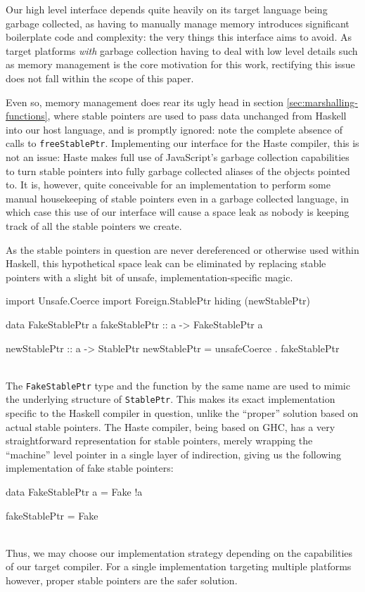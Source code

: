 \documentclass[preprint]{sigplanconf}
\begin{document}
Our high level interface depends quite heavily on its target language being
garbage collected, as having to manually manage memory introduces significant
boilerplate code and complexity: the very things this interface aims to avoid.
As target platforms \emph{with} garbage collection having to deal with low
level details such as memory management is the core motivation for this work,
rectifying this issue does not fall within the scope of this paper.

Even so, memory management does rear its ugly head in section
\ref{sec:marshalling-functions}, where stable pointers are used to pass data
unchanged from Haskell into our host language, and is promptly ignored: note
the complete absence of calls to \lstinline!freeStablePtr!. Implementing our
interface for the Haste compiler, this is not an issue: Haste makes full use
of JavaScript's garbage collection capabilities to turn stable pointers into
fully garbage collected aliases of the objects pointed to.
It is, however, quite conceivable for an implementation to perform some manual
housekeeping of stable pointers even in a garbage collected language, in which
case this use of our interface will cause a space leak as nobody is keeping
track of all the stable pointers we create.

As the stable pointers in question are never dereferenced or otherwise
used within Haskell, this hypothetical space leak can be eliminated by
replacing stable pointers with a slight bit of unsafe, implementation-specific
magic.\\
\begin{code}
  import Unsafe.Coerce
  import Foreign.StablePtr hiding (newStablePtr)

  data FakeStablePtr a
  fakeStablePtr :: a -> FakeStablePtr a

  newStablePtr :: a -> StablePtr
  newStablePtr = unsafeCoerce . fakeStablePtr
\end{code}\\
The \lstinline!FakeStablePtr! type and the function by the same name are used
to mimic the underlying structure of \lstinline!StablePtr!. This makes its
exact implementation specific to the Haskell compiler in question, unlike
the ``proper'' solution based on actual stable pointers. The Haste
compiler, being based on GHC, has a very straightforward representation for
stable pointers, merely wrapping the ``machine'' level pointer in a single
layer of indirection, giving us the following implementation of fake stable
pointers:\\
\begin{code}
  data FakeStablePtr a = Fake !a

  fakeStablePtr = Fake
\end{code}\\
Thus, we may choose our implementation strategy depending on the capabilities
of our target compiler. For a single implementation targeting multiple
platforms however, proper stable pointers are the safer solution.
\end{document}
